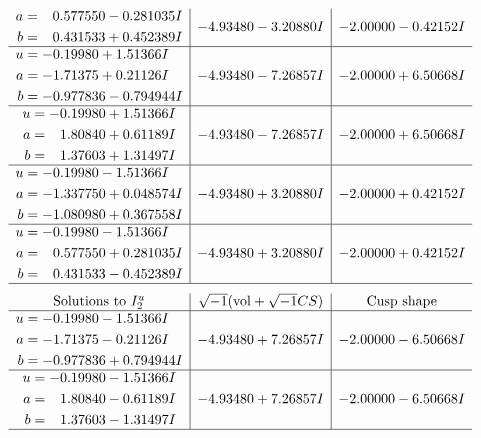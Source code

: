 \documentclass[1p]{elsarticle_modified}
\theoremstyle{definition}
\newcommand{\I}{\sqrt{-1}}
\begin{document}
$$\begin{array}{c|c|c}
\begin{aligned}
a &= \phantom{-}0.577550 - 0.281035 I \\
b &= \phantom{-}0.431533 + 0.452389 I\end{aligned}
 & -4.93480 - 3.20880 I & -2.00000 - 0.42152 I \\ \hline\begin{aligned}
u &= -0.19980 + 1.51366 I \\
a &= -1.71375 + 0.21126 I \\
b &= -0.977836 - 0.794944 I\end{aligned}
 & -4.93480 - 7.26857 I & -2.00000 + 6.50668 I \\ \hline\begin{aligned}
u &= -0.19980 + 1.51366 I \\
a &= \phantom{-}1.80840 + 0.61189 I \\
b &= \phantom{-}1.37603 + 1.31497 I\end{aligned}
 & -4.93480 - 7.26857 I & -2.00000 + 6.50668 I \\ \hline\begin{aligned}
u &= -0.19980 - 1.51366 I \\
a &= -1.337750 + 0.048574 I \\
b &= -1.080980 + 0.367558 I\end{aligned}
 & -4.93480 + 3.20880 I & -2.00000 + 0.42152 I \\ \hline\begin{aligned}
u &= -0.19980 - 1.51366 I \\
a &= \phantom{-}0.577550 + 0.281035 I \\
b &= \phantom{-}0.431533 - 0.452389 I\end{aligned}
 & -4.93480 + 3.20880 I & -2.00000 + 0.42152 I\\
 \hline 
 \end{array}$$\newpage$$\begin{array}{c|c|c}  
\text{Solutions to }I^u_{2}& \I (\text{vol} + \sqrt{-1}CS) & \text{Cusp shape}\\
 \hline 
\begin{aligned}
u &= -0.19980 - 1.51366 I \\
a &= -1.71375 - 0.21126 I \\
b &= -0.977836 + 0.794944 I\end{aligned}
 & -4.93480 + 7.26857 I & -2.00000 - 6.50668 I \\ \hline\begin{aligned}
u &= -0.19980 - 1.51366 I \\
a &= \phantom{-}1.80840 - 0.61189 I \\
b &= \phantom{-}1.37603 - 1.31497 I\end{aligned}
 & -4.93480 + 7.26857 I & -2.00000 - 6.50668 I\\
 \hline 
 \end{array}$$\newpage\newpage\renewcommand{\arraystretch}{1}
\end{document}
